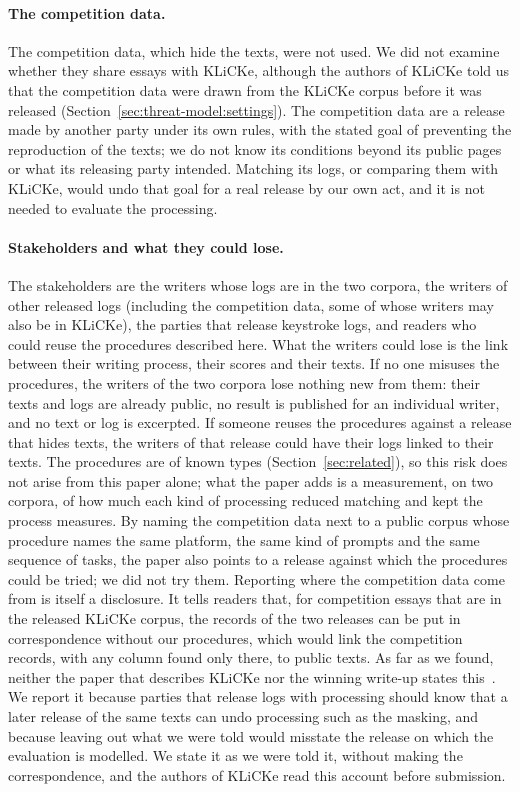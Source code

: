 \begin{ethics}
\paragraph{The competition data.}
The competition data, which hide the texts, were not used. We did not examine whether they share essays with KLiCKe,
although the authors of KLiCKe told us that the competition data were drawn from the KLiCKe corpus before it was
released (Section~\ref{sec:threat-model:settings}). The competition data are a release made by another party under its
own rules, with the stated goal of preventing the reproduction of the texts; we do not know its conditions beyond its
public pages or what its releasing party intended. Matching its logs, or comparing them with KLiCKe, would undo that
goal for a real release by our own act, and it is not needed to evaluate the processing.

\paragraph{Stakeholders and what they could lose.}
The stakeholders are the writers whose logs are in the two corpora, the writers of other released logs (including the
competition data, some of whose writers may also be in KLiCKe), the parties that release keystroke logs, and readers who could reuse the procedures described here.
What the writers could lose is the link between their writing process, their scores and their texts. If no one misuses
the procedures, the writers of the two corpora lose nothing new from them: their texts and logs are already public, no result is
published for an individual writer, and no text or log is excerpted. If someone reuses the procedures against a
release that hides texts, the writers of that release could have their logs linked to their texts. The procedures are
of known types (Section~\ref{sec:related}), so this risk does not arise from this paper alone; what the paper adds is
a measurement, on two corpora, of how much each kind of processing reduced matching and kept the process measures. By
naming the competition data next to a public corpus whose procedure names the same platform, the same kind of prompts
and the same sequence of tasks, the paper also points to a release against which the procedures could be tried; we
did not try them. Reporting where the competition data come from is
itself a disclosure. It tells readers that, for competition essays that are in the released KLiCKe corpus, the records
of the two releases can be put in correspondence without our procedures, which would link the competition records,
with any column found only there, to public texts. As far as we found, neither the paper that describes KLiCKe nor
the winning write-up states this~\cite{tian2025klicke,inubushi2024first}. We report it because parties that release logs
with processing should know that a later release of the same texts can undo processing such as the masking, and because leaving out what we were told
would misstate the release on which the evaluation is modelled. We state it as we were told it, without making the
correspondence, and the authors of KLiCKe read this account before submission.


\end{ethics}
